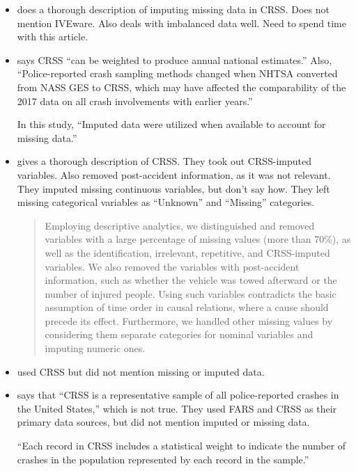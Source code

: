 \begin{itemize}
	\item \cite{TOPUZ2021113557} does a thorough description of imputing missing data in CRSS.  Does not mention IVEware.  Also deals with imbalanced data well.  Need to spend time with this article. 

	\item \cite{COX2021288} says CRSS ``can be
weighted to produce annual national estimates.''  Also, ``Police-reported
crash sampling methods changed when NHTSA converted from
NASS GES to CRSS, which may have affected the comparability of
the 2017 data on all crash involvements with earlier years.''
	
	In this study, 
	``Imputed data were utilized when available to account for missing data.''
	
	\item \cite{AMINI2022108720} gives a thorough description of CRSS.  They took out CRSS-imputed variables.  Also removed post-accident information, as it was not relevant.  They imputed missing continuous variables, but don't say how.  They left missing categorical variables as ``Unknown'' and ``Missing'' categories.  
	
\begin{quote}
	Employing descriptive analytics, we distinguished and removed
variables with a large percentage of missing values (more than 70\%), as
well as the identification, irrelevant, repetitive, and CRSS-imputed
variables. We also removed the variables with post-accident information,
such as whether the vehicle was towed afterward or the number of
injured people. Using such variables contradicts the basic assumption of
time order in causal relations, where a cause should precede its effect.
Furthermore, we handled other missing values by considering them
separate categories for nominal variables and imputing numeric ones.
\end{quote}	

	\item \cite{SPICER2021105974} used CRSS but did not mention missing or imputed data.  
	
	\item \cite{VILLAVICENCIO2022757} says that ``CRSS is a representative
sample of all police-reported crashes in the United States,'' which is not true.  They used FARS and CRSS as their primary data sources, but did not mention imputed or missing data.  
	
	``Each record in CRSS includes a statistical weight to
indicate the number of crashes in the population represented by
each record in the sample.''  
	

\end{itemize}
